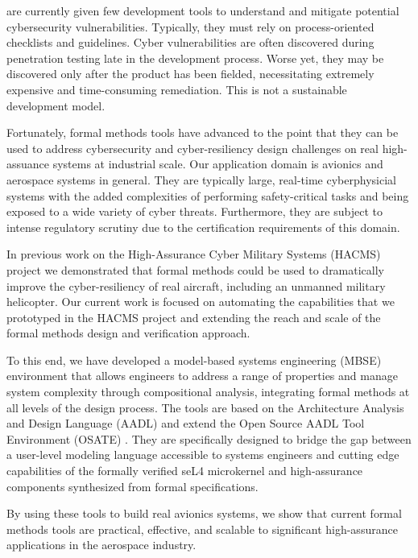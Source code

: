  are currently given few
development tools to understand and mitigate 
potential cybersecurity vulnerabilities.  Typically, they must rely on
process-oriented checklists and guidelines. Cyber vulnerabilities
are often discovered during penetration testing late in the
development process. Worse yet, they may be discovered
only after the product has been fielded, necessitating extremely
expensive and time-consuming remediation. This is not a
sustainable development model.

Fortunately, formal methods tools have advanced to the point that they can 
be used to address cybersecurity and cyber-resiliency design challenges
on real high-assuance systems at industrial scale.  
Our application domain is avionics and aerospace systems in general.  
They are typically large, real-time cyberphysicial systems with the added 
complexities of performing safety-critical tasks and being exposed to 
a wide variety of cyber threats.  Furthermore, they are subject 
to intense regulatory scrutiny due to the certification requirements of this domain. 

In previous work on the High-Assurance Cyber Military Systems (HACMS) project \cite{HACMS}
we demonstrated that formal methods could be used to dramatically improve the 
cyber-resiliency of real aircraft, including an unmanned military helicopter.  Our current
work is focused on automating the capabilities that we prototyped in the HACMS project
and extending the reach and scale of the formal methods design and verification approach.  

To this end, we have developed a model-based systems engineering (MBSE) 
environment that allows engineers to address a range of properties and 
manage system complexity through compositional analysis, integrating formal methods
at all levels of the design process.  The tools are based on the 
Architecture Analysis and Design Language (AADL) and extend the Open Source
AADL Tool Environment (OSATE) \cite{aadl}.  They are specifically designed 
to bridge the gap between a user-level modeling language accessible to systems 
engineers and cutting edge capabilities of the formally verified seL4 microkernel \cite{seL4}
and high-assurance components synthesized from formal specifications.  

By using these tools to build real avionics systems, we show 
that current formal methods tools are practical, effective, and scalable to significant 
high-assurance applications in the aerospace industry.  


